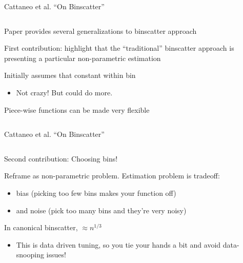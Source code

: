 \documentclass[notes,11pt, aspectratio=169]{beamer}
\newcommand\1{\operatorname{\mathbbm{1}}\indicatorfence}
\newenvironment{wideitemize}{\itemize\addtolength{\itemsep}{10pt}}{\enditemize}
\begin{document}
\begin{frame}{Cattaneo et al. ``On Binscatter''}
  \begin{columns}[T] %
    \begin{column}{.5\textwidth}
      \begin{wideitemize}
      \item Paper provides several generalizations to binscatter approach
      \item First contribution: highlight that the ``traditional''
        binscatter approach is presenting a particular non-parametric
        estimation
      \item Initially assumes that constant within bin
        \begin{itemize}
        \item Not crazy! But could do more. 
        \end{itemize}
      \item Piece-wise functions can be made very flexible
  \end{wideitemize}
  \end{column}%
  \hfill%
  \begin{column}{.5\textwidth}
  \end{column}
\end{columns}
  
\end{frame}

\begin{frame}{Cattaneo et al. ``On Binscatter''}
  \begin{columns}[T] %
    \begin{column}{.7\textwidth}
      \begin{wideitemize}
      \item Second contribution: Choosing bins!
      \item Reframe as non-parametric problem. Estimation problem is tradeoff:
        \begin{itemize}
        \item  bias (picking too few bins makes your function off)
        \item and noise (pick too many bins and they're very noisy)
        \end{itemize}
      \item In canonical binscatter, $\approx n^{1/3}$
        \begin{itemize}
        \item This is data driven tuning, so you tie your hands a bit and
          avoid data-snooping issues!
        \end{itemize}
  \end{wideitemize}
  \end{column}%
  \hfill%
  \begin{column}{.5\textwidth}
  \end{column}
\end{columns}
\end{frame}
\end{document}
